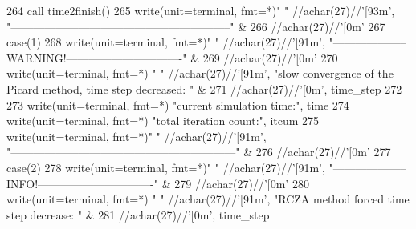 \begin{DoxyCode}
264           \textcolor{keyword}{call }time2finish()
265           \textcolor{keyword}{write}(unit=terminal, fmt=*)\textcolor{stringliteral}{" "} //achar(27)//\textcolor{stringliteral}{'[93m'},  \textcolor{stringliteral}{
      "-----------------------------------------------------------"}\textcolor{comment}{ &}
266 \textcolor{comment}{                                          //achar(27)//}\textcolor{stringliteral}{'[0m'}
267         \textcolor{keywordflow}{case}(1)
268           \textcolor{keyword}{write}(unit=terminal, fmt=*)\textcolor{stringliteral}{" "} //achar(27)//\textcolor{stringliteral}{'[91m'},  \textcolor{stringliteral}{
      "--------------------WARNING!-------------------------------"}\textcolor{comment}{ &}
269 \textcolor{comment}{                                          //achar(27)//}\textcolor{stringliteral}{'[0m'}
270           \textcolor{keyword}{write}(unit=terminal, fmt=*) \textcolor{stringliteral}{" "} //achar(27)//\textcolor{stringliteral}{'[91m'}, \textcolor{stringliteral}{"slow convergence of the Picard method, time
       step decreased: "}\textcolor{comment}{ &}
271 \textcolor{comment}{                                      //achar(27)//}\textcolor{stringliteral}{'[0m'}, time_step
272 
273           \textcolor{keyword}{write}(unit=terminal, fmt=*) \textcolor{stringliteral}{"current simulation time:"}, time
274           \textcolor{keyword}{write}(unit=terminal, fmt=*) \textcolor{stringliteral}{"total iteration count:"}, itcum
275           \textcolor{keyword}{write}(unit=terminal, fmt=*)\textcolor{stringliteral}{" "} //achar(27)//\textcolor{stringliteral}{'[91m'},  \textcolor{stringliteral}{
      "------------------------------------------------------------"}\textcolor{comment}{ &}
276 \textcolor{comment}{                                          //achar(27)//}\textcolor{stringliteral}{'[0m'}
277         \textcolor{keywordflow}{case}(2)
278           \textcolor{keyword}{write}(unit=terminal, fmt=*)\textcolor{stringliteral}{" "} //achar(27)//\textcolor{stringliteral}{'[91m'},  \textcolor{stringliteral}{
      "--------------------INFO!-------------------------------"}\textcolor{comment}{ &}
279 \textcolor{comment}{                                          //achar(27)//}\textcolor{stringliteral}{'[0m'}
280           \textcolor{keyword}{write}(unit=terminal, fmt=*) \textcolor{stringliteral}{" "} //achar(27)//\textcolor{stringliteral}{'[91m'}, \textcolor{stringliteral}{"RCZA method forced time step decrease: "}\textcolor{comment}{ &}
281 \textcolor{comment}{                                      //achar(27)//}\textcolor{stringliteral}{'[0m'}, time_step

\end{DoxyCode}
